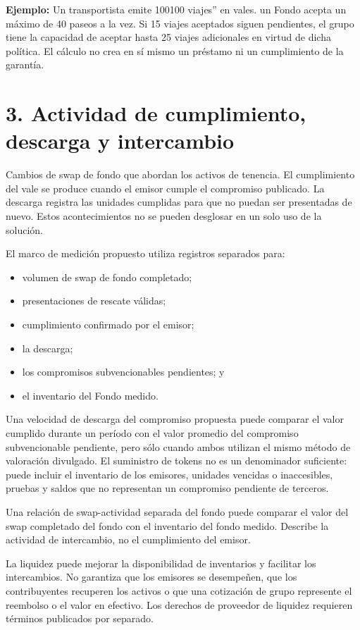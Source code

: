 \documentclass[11pt]{article}
\begin{document}
\textbf{Ejemplo:} Un transportista emite 100100 viajes'' en vales. un Fondo acepta un máximo de 40 paseos a la vez. Si 15 viajes aceptados siguen pendientes, el grupo tiene la capacidad de aceptar hasta 25 viajes adicionales en virtud de dicha política. El cálculo no crea en sí mismo un préstamo ni un cumplimiento de la garantía.



\section*{3. Actividad de cumplimiento, descarga y intercambio}

Cambios de swap de fondo que abordan los activos de tenencia. El cumplimiento del vale se produce cuando el emisor cumple el compromiso publicado. La descarga registra las unidades cumplidas para que no puedan ser presentadas de nuevo. Estos acontecimientos no se pueden desglosar en un solo uso de la solución.

El marco de medición propuesto utiliza registros separados para:

\begin{itemize}[leftmargin=*]
\item volumen de swap de fondo completado;
\item presentaciones de rescate válidas;
\item cumplimiento confirmado por el emisor;
\item la descarga;
\item los compromisos subvencionables pendientes; y
\item el inventario del Fondo medido.
\end{itemize}
Una velocidad de descarga del compromiso propuesta puede comparar el valor cumplido durante un período con el valor promedio del compromiso subvencionable pendiente, pero sólo cuando ambos utilizan el mismo método de valoración divulgado. El suministro de tokens no es un denominador suficiente: puede incluir el inventario de los emisores, unidades vencidas o inaccesibles, pruebas y saldos que no representan un compromiso pendiente de terceros.

Una relación de swap-actividad separada del fondo puede comparar el valor del swap completado del fondo con el inventario del fondo medido. Describe la actividad de intercambio, no el cumplimiento del emisor.

La liquidez puede mejorar la disponibilidad de inventarios y facilitar los intercambios. No garantiza que los emisores se desempeñen, que los contribuyentes recuperen los activos o que una cotización de grupo represente el reembolso o el valor en efectivo. Los derechos de proveedor de liquidez requieren términos publicados por separado.
\end{document}
